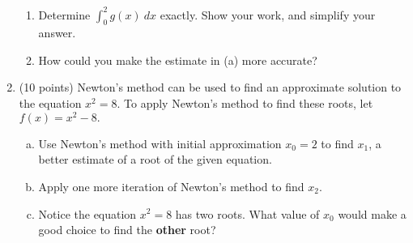 \documentclass[11pt]{article}
\begin{document}
\begin{enumerate}
\begin{enumerate}
\item Determine $\displaystyle{\int_0^2 g(x) \: dx}$
exactly. Show your work, and simplify your answer.\\
\vfill
\vfill
\vfill
\item How could you make the estimate in (a) more accurate?\\
\vspace{.75in}
\end{enumerate}
%
%
%
%
%
%
%
%






\newpage

\item (10 points) Newton's method can be used to find an approximate solution to the equation $x^2 = 8.$ To apply Newton's method to find these roots, let $f(x) = x^2 - 8.$

\begin{enumerate}[(a)]
	\item Use Newton's method with initial approximation $x_0 = 2$ to find $x_1$, a better estimate of a root of the given equation.
	\vfill
	\item Apply one more iteration of Newton's method to find $x_2$.
	\vfill
	\item Notice the equation $x^2 = 8$ has two roots. What value of $x_0$ would make a good choice to find the \textbf{other} root?
	\vfill
\end{enumerate}



\end{enumerate}
\end{document}
